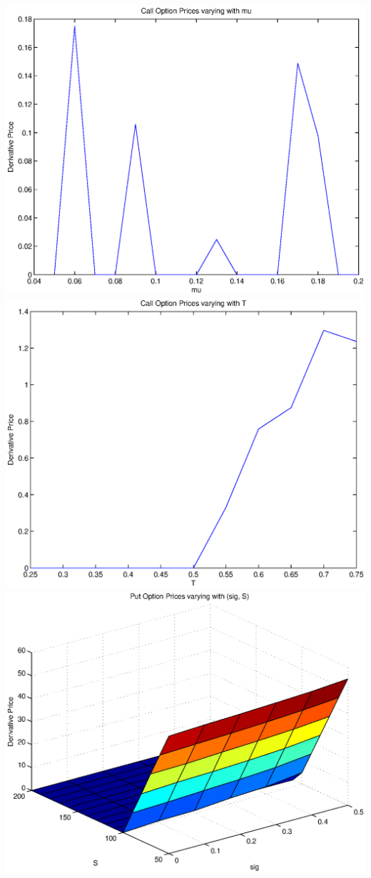 \documentclass{article}
\begin{document}
\includegraphics[width=\textwidth]{Call_Option_Prices_varying_with_mu}
\includegraphics[width=\textwidth]{Call_Option_Prices_varying_with_T}
\includegraphics[width=\textwidth]{Put_Option_Prices_varying_with_(sig,_S)}
\end{document}
